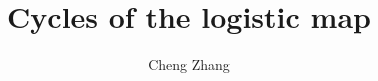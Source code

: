 \documentclass{ws-ijbc}
\begin{document}
\newcommand{\odd}{\mathrm{odd}}

\newcommand{\vct}[1]{\mathbf{#1}}




\newcommand{\vx}{\vct x}
\newcommand{\vxn}[1]{\vx_{#1}}
\newcommand{\Tr}{\mathrm{Tr}}
\newcommand{\Pset}{\mathcal P}
\newcommand{\NB}{N_\Pset}
\newcommand{\LB}{L_\Pset}
\newcommand{\lam}{(\lambda)}
\newcommand{\Rlam}{(R, \lambda)}
\newcommand{\rlam}{(r, \lambda)}

\newcommand{\eq}{Eq.}
\newcommand{\eqs}{Eqs.}
\newcommand{\req}[1]{(\ref{eq:#1})}
\newcommand{\refeq}[1]{\eq\,\req{#1}}
\newcommand{\refeqs}[1]{\eqs\,\req{#1}}
\newcommand{\reqsub}[2]{(\ref{eq:#1}#2)}
\newcommand{\refeqsub}[2]{\eq\,\reqsub{#1}{#2}}
\newcommand{\refeqssub}[2]{\eqs\,\reqsub{#1}{#2}}

\newcommand{\refthm}[1]{Theorem \ref{thm:#1}}
\newcommand{\refthms}[1]{Theorems \ref{thm:#1}}
\newcommand{\refsec}[1]{Section \ref{sec:#1}}
\newcommand{\refsecs}[1]{Sections \ref{sec:#1}}
\newcommand{\refapd}[1]{Appendix \ref{apd:#1}}
\newcommand{\reftab}[1]{Table \ref{tab:#1}}
\newcommand{\reftabs}[1]{Tables \ref{tab:#1}}
\newcommand{\reffig}[1]{Fig. \ref{fig:#1}}
\newcommand{\reffigs}[1]{Figs. \ref{fig:#1}}



\catchline{}{}{}{}{}




\title{Cycles of the logistic map}
\author{Cheng Zhang}
\address{Applied Physics Program \& Department of Bioengineering,
Rice University, Houston, TX 77005, USA}

\maketitle


\begin{history}
\received{}
\end{history}
\end{document}
